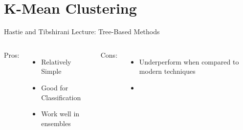 \documentclass{beamer}
\begin{document}
\section[K-Means]{K-Mean Clustering}

\begin{frame}{Hastie and Tibshirani Lecture: Tree-Based Methods}
		\begin{columns}
		Pros:
		\begin{itemize}
			\item Relatively Simple
			\item Good for Classification
			\item Work well in ensembles
		\end{itemize}
		
		Cons:
		\begin{itemize}
			\item Underperform when compared to modern techniques
			\item[]
		\end{itemize}
	\end{columns}
\end{frame}
\end{document}
